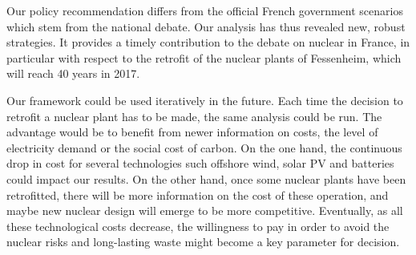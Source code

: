 Our policy recommendation differs from the official French government scenarios which stem from the national debate. Our analysis has thus revealed new, robust strategies. It provides a timely contribution to the debate on nuclear in France, in particular with respect to the retrofit of the nuclear plants of Fessenheim, which will reach 40 years in 2017.

Our framework could be used iteratively in the future. Each time the decision to retrofit a nuclear plant has to be made, the same analysis could be run. The advantage would be to benefit from newer information on costs, the level of electricity demand or the social cost of carbon. On the one hand, the continuous drop in cost for several technologies such offshore wind, solar PV and batteries could impact our results. On the other hand, once some nuclear plants have been retrofitted, there will be more information on the cost of these operation, and maybe new nuclear design will emerge to be more competitive. Eventually, as all these technological costs decrease, the willingness to pay in order to avoid the nuclear risks and long-lasting waste might become a key parameter for decision.

